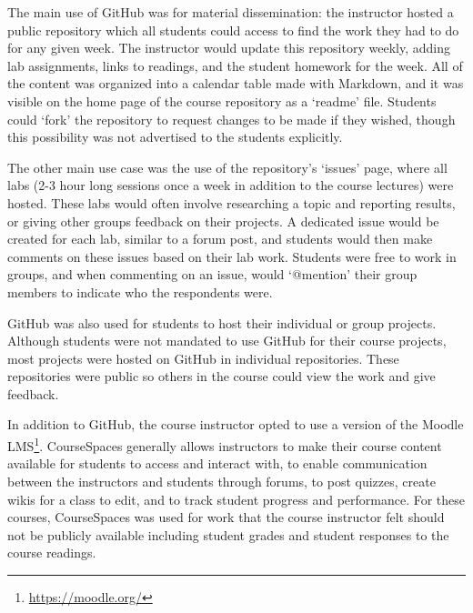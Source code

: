 
The main use of GitHub was for material dissemination: the instructor hosted a public repository which all students could access to find the work they had to do for any given week. The instructor would update this repository weekly, adding lab assignments, links to readings, and the student homework for the week. All of the content was organized into a calendar table made with Markdown, and it was visible on the home page of the course repository as a `readme' file. Students could `fork' the repository to request changes to be made if they wished, though this possibility was not advertised to the students explicitly.

The other main use case was the use of the repository's `issues' page, where all labs (2-3 hour long sessions once a week in addition to the course lectures) were hosted. These labs would often involve researching a topic and reporting results, or giving other groups feedback on their projects. A dedicated issue would be created for each lab, similar to a forum post, and students would then make comments on these issues based on their lab work. Students were free to work in groups, and when commenting on an issue, would `@mention' their group members to indicate who the respondents were.

GitHub was also used for students to host their individual or group projects. Although students were not mandated to use GitHub for their course projects, most projects were hosted on GitHub in individual repositories. These repositories were public so others in the course could view the work and give feedback.

In addition to GitHub, the course instructor opted to use a version of the Moodle LMS\footnote{\url{https://moodle.org/}}. CourseSpaces generally allows instructors to make their course content available for students to access and interact with, to enable communication between the instructors and students through forums, to post quizzes, create wikis for a class to edit, and to track student progress and performance. For these courses, CourseSpaces was used for work that the course instructor felt should not be publicly available including student grades and student responses to the course readings.
